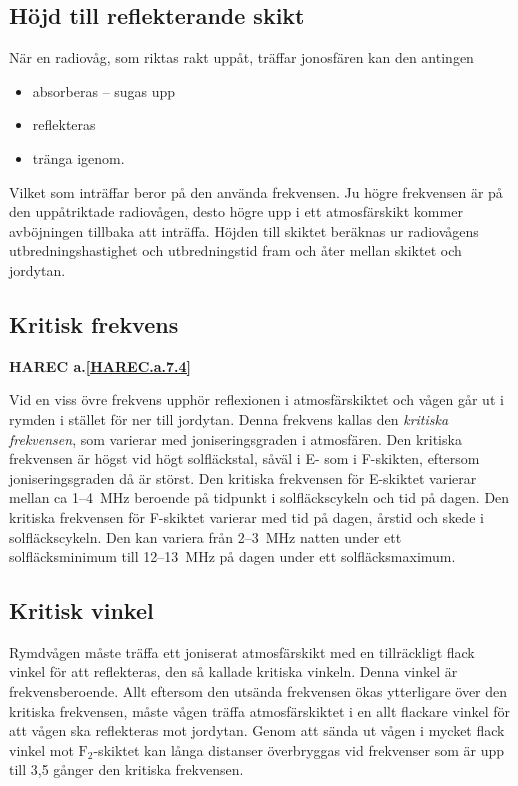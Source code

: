 \subsection{Höjd till reflekterande skikt}

När en radiovåg, som riktas rakt uppåt, träffar jonosfären kan den antingen
\begin{itemize}
  \item absorberas -- sugas upp
  \item reflekteras
  \item tränga igenom.
\end{itemize}

Vilket som inträffar beror på den använda frekvensen.
Ju högre frekvensen är på den uppåtriktade radiovågen, desto högre upp i ett
atmosfärskikt kommer avböjningen tillbaka att inträffa.
Höjden till skiktet beräknas ur radiovågens utbredningshastighet och
utbredningstid fram och åter mellan skiktet och jordytan.

\subsection{Kritisk frekvens}
\textbf{
HAREC a.\ref{HAREC.a.7.4}\label{myHAREC.a.7.4}
}

Vid en viss övre frekvens upphör reflexionen i atmosfärskiktet och
vågen går ut i rymden i stället för ner till jordytan.
Denna frekvens kallas den \emph{kritiska frekvensen}, som varierar med
joniseringsgraden i atmosfären.
Den kritiska frekvensen är högst vid högt solfläckstal, såväl i E- som i
F-skikten, eftersom joniseringsgraden då är störst.
Den kritiska frekvensen för E-skiktet varierar mellan ca 1--4~MHz beroende på
tidpunkt i solfläckscykeln och tid på dagen.
Den kritiska frekvensen för F-skiktet varierar med tid på dagen, årstid och
skede i solfläckscykeln.
Den kan variera från 2--3~MHz natten under ett solfläcksminimum till 12--13~MHz
på dagen under ett solfläcksmaximum.

\subsection{Kritisk vinkel}

Rymdvågen måste träffa ett joniserat atmosfärskikt med en tillräckligt
flack vinkel för att reflekteras, den så kallade kritiska vinkeln.
Denna vinkel är frekvensberoende.
Allt eftersom den utsända frekvensen ökas ytterligare över den kritiska
frekvensen, måste vågen träffa atmosfärskiktet i en allt flackare vinkel för att
vågen ska reflekteras mot jordytan.
Genom att sända ut vågen i mycket flack vinkel mot \(\mathrm{F_2}\)-skiktet kan
långa distanser överbryggas vid frekvenser som är upp till 3,5 gånger den
kritiska frekvensen.

